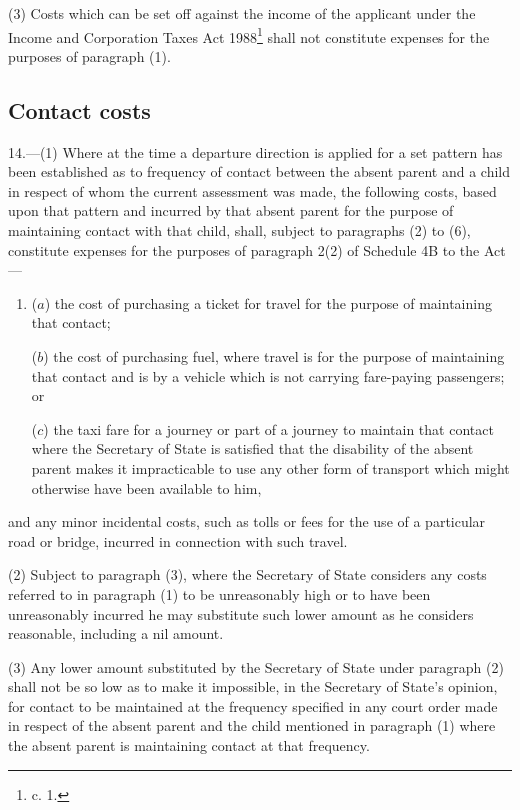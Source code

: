 \documentclass[12pt,a4paper]{article}
\begin{document}
(3) Costs which can be set off against the income of the applicant under the
Income and Corporation Taxes Act 1988\footnote{ c. 1.} shall not constitute expenses for the
purposes of paragraph (1).

\subsection[14. Contact costs]{Contact costs}

14.—(1) Where at the time a departure direction is applied for a
set pattern has been established as to frequency of contact between the absent
parent and a child in respect of whom the current assessment was made, the
following costs, based upon that pattern and incurred by that absent parent for
the purpose of maintaining contact with that child, shall, subject to paragraphs
(2) to (6), constitute expenses for the purposes of paragraph 2(2) of Schedule
4B to the Act—
\begin{enumerate}\item[]
($a$) the cost of purchasing a ticket for travel for the purpose of maintaining
that contact;

($b$) the cost of purchasing fuel, where travel is for the purpose of maintaining
that contact and is by a vehicle which is not carrying fare-paying passengers;
or

($c$) the taxi fare for a journey or part of a journey to maintain that contact
where the Secretary of State is satisfied that the disability of the absent
parent makes it impracticable to use any other form of transport which might
otherwise have been available to him,
\end{enumerate}
and any minor incidental costs, such as tolls or fees for the use of a
particular road or bridge, incurred in connection with such travel.

(2) Subject to paragraph (3), where the Secretary of State considers any costs
referred to in paragraph (1) to be unreasonably high or to have been
unreasonably incurred he may substitute such lower amount as he considers
reasonable, including a nil amount.

(3) Any lower amount substituted by the Secretary of State under paragraph (2)
shall not be so low as to make it impossible, in the Secretary of State’s
opinion, for contact to be maintained at the frequency specified in any court
order made in respect of the absent parent and the child mentioned in paragraph
(1) where the absent parent is maintaining contact at that frequency.
\end{document}
